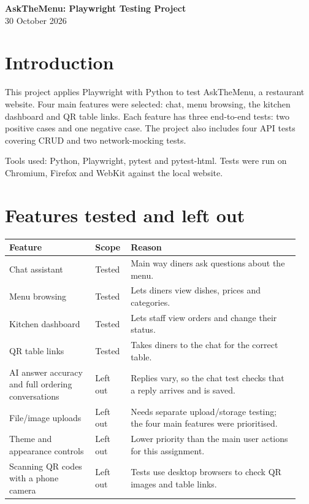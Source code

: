 \documentclass[10pt,a4paper]{article}
\begin{document}
\begin{center}{\Large\bfseries AskTheMenu: Playwright Testing Project}\\[5pt]

30 October 2026

\end{center}

\section{Introduction}

This project applies Playwright with Python to test AskTheMenu, a restaurant website. Four main features were selected: chat, menu browsing, the kitchen dashboard and QR table links. Each feature has three end-to-end tests: two positive cases and one negative case. The project also includes four API tests covering CRUD and two network-mocking tests.

Tools used: Python, Playwright, pytest and pytest-html. Tests were run on Chromium, Firefox and WebKit against the local website.

\section{Features tested and left out}

\small
\begin{longtable}{p{0.28\linewidth}p{0.11\linewidth}p{0.55\linewidth}}
\toprule
\textbf{Feature} & \textbf{Scope} & \textbf{Reason} \\ \midrule \endhead
Chat assistant & Tested & Main way diners ask questions about the menu. \\
Menu browsing & Tested & Lets diners view dishes, prices and categories. \\
Kitchen dashboard & Tested & Lets staff view orders and change their status. \\
QR table links & Tested & Takes diners to the chat for the correct table. \\
AI answer accuracy and full ordering conversations & Left out & Replies vary, so the chat test checks that a reply arrives and is saved. \\
File/image uploads & Left out & Needs separate upload/storage testing; the four main features were prioritised. \\
Theme and appearance controls & Left out & Lower priority than the main user actions for this assignment. \\
Scanning QR codes with a phone camera & Left out & Tests use desktop browsers to check QR images and table links. \\
\bottomrule\end{longtable}
\normalsize
\end{document}
